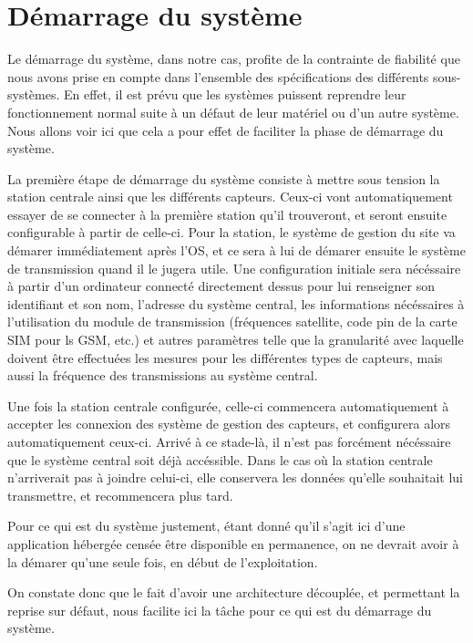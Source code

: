 \section{Démarrage du système}

Le démarrage du système, dans notre cas, profite de la contrainte de fiabilité que nous avons prise en compte dans l'ensemble des spécifications des différents sous-systèmes. En effet, il est prévu que les systèmes puissent reprendre leur fonctionnement normal suite à un défaut de leur matériel ou d'un autre système. Nous allons voir ici que cela a pour effet de faciliter la phase de démarrage du système.

La première étape de démarrage du système consiste à mettre sous tension la station centrale ainsi que les différents capteurs. Ceux-ci vont automatiquement essayer de se connecter à la première station qu'il trouveront, et seront ensuite configurable à partir de celle-ci. Pour la station, le système de gestion du site va démarer immédiatement après l'OS, et ce sera à lui de démarer ensuite le système de transmission quand il le jugera utile. Une configuration initiale sera nécéssaire à partir d'un ordinateur connecté directement dessus pour lui renseigner son identifiant et son nom, l'adresse du système central, les informations nécéssaires à l'utilisation du module de transmission (fréquences satellite, code pin de la carte SIM pour ls GSM, etc.) et autres paramètres telle que la granularité avec laquelle doivent être effectuées les mesures pour les différentes types de capteurs, mais aussi la fréquence des transmissions au système central.

Une fois la station centrale configurée, celle-ci commencera automatiquement à accepter les connexion des système de gestion des capteurs, et configurera alors automatiquement ceux-ci. Arrivé à ce stade-là, il n'est pas forcément nécéssaire que le système central soit déjà accéssible. Dans le cas où la station centrale n'arriverait pas à joindre celui-ci, elle conservera les données qu'elle souhaitait lui transmettre, et recommencera plus tard.

Pour ce qui est du système justement, étant donné qu'il s'agit ici d'une application hébergée censée être disponible en permanence, on ne devrait avoir à la démarer qu'une seule fois, en début de l'exploitation.

On constate donc que le fait d'avoir une architecture découplée, et permettant la reprise sur défaut, nous facilite ici la tâche pour ce qui est du démarrage du système.